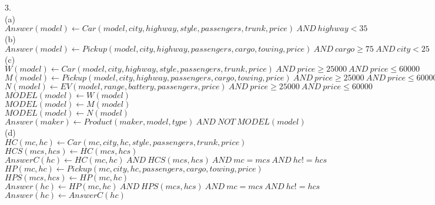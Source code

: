 \documentclass[11pt, oneside]{article}   	%
\begin{document}
3.\\

(a)\\
$Answer(model) \gets Car(model, city, highway, style, passengers, trunk, price) \ AND \ highway<35$\\

(b)\\
$Answer(model) \gets Pickup(model, city, highway, passengers, cargo, towing, price) \ AND \ cargo \geq 75 \ AND \ city<25 $\\

(c)\\
$W(model) \gets Car(model, city, highway, style, passengers, trunk, price) \ AND \ price\geq 25000 \ AND\ price \leq 60000   $\\
$M(model) \gets Pickup(model, city, highway, passengers, cargo, towing, price) \ AND \ price\geq 25000 \ AND\ price \leq 60000 $\\
$N(model) \gets EV(model, range, battery, passengers, price) \ AND \ price\geq 25000 \ AND\ price \leq 60000 $\\
$MODEL(model) \gets W(model)$\\
$MODEL(model) \gets M(model)$\\
$MODEL(model) \gets N(model)$\\
$Answer(maker) \gets Product(maker, model, type) \ AND \ NOT \ MODEL(model) $\\

(d)\\
$HC(mc, hc) \gets Car(mc, city, hc, style, passengers, trunk, price)$\\
$HCS(mcs, hcs) \gets HC(mcs, hcs)$\\
$AnswerC(hc) \gets HC(mc, hc) \ AND\ HCS(mcs, hcs) \ AND\ mc=mcs\ AND \ hc!=hcs $\\
$HP(mc, hc) \gets Pickup(mc, city, hc, passengers, cargo, towing, price)$\\
$HPS(mcs, hcs) \gets HP(mc, hc) $\\
$Answer(hc) \gets HP(mc, hc) \ AND \ HPS(mcs, hcs)\ AND \ mc=mcs \ AND \ hc != hcs  $\\
$Answer(hc) \gets AnswerC(hc)$\\
\end{document}
